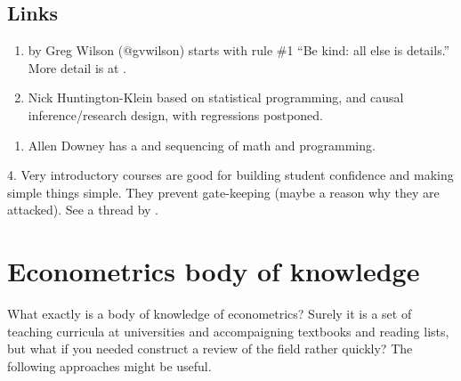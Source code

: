 \documentclass[letterpaper,10pt,english]{sphinxmanual}
\begin{document}
\subsection{Links}
\label{\detokenize{how-to-teach/pedagogy:links}}\begin{enumerate}
%
\item {} 
 by Greg Wilson (@gvwilson) starts with rule \#1 “Be kind: all else is details.” More detail is at .

\item {} 
Nick Huntington-Klein  based on statistical programming, and causal inference/research design, with regressions postponed.

\end{enumerate}

 
\begin{enumerate}
%
\setcounter{enumi}{2}
\item {} 
Allen Downey has a  and sequencing of math and programming.

\end{enumerate}

 

4. Very introductory courses are good for building student confidence and making simple things simple. They prevent gate-keeping (maybe a reason why they are attacked). See a thread by
.


\section{Econometrics body of knowledge}
\label{\detokenize{how-to-teach/ways-into-econometrics:econometrics-body-of-knowledge}}\label{\detokenize{how-to-teach/ways-into-econometrics::doc}}
What exactly is a body of knowledge of econometrics? Surely it is a set of
teaching curricula at universities and accompaigning textbooks and reading lists,
but what if you needed construct a review of the field rather quickly?
The following approaches might be useful.
\end{document}

